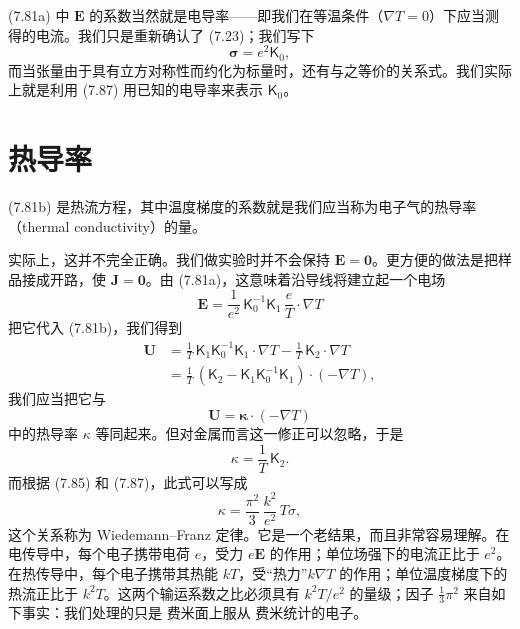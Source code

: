 (7.81a) 中 $\mathbf{E}$ 的系数当然就是电导率——即我们在等温条件（$\nabla T=0$）下应当测得的电流。我们只是重新确认了 (7.23)；我们写下
\begin{equation*}
\boldsymbol{\sigma}=e^{2}\mathsf{K}_{0},\tag{7.87}
\end{equation*}
而当张量由于具有立方对称性而约化为标量时，还有与之等价的关系式。我们实际上就是利用 (7.87) 用已知的电导率来表示 $\mathsf{K}_{0}$。

\section{热导率}

(7.81b) 是热流方程，其中温度梯度的系数就是我们应当称为电子气的热导率（thermal conductivity）的量。

实际上，这并不完全正确。我们做实验时并不会保持 $\mathbf{E}=\mathbf{0}$。更方便的做法是把样品接成开路，使 $\mathbf{J}=\mathbf{0}$。由 (7.81a)，这意味着沿导线将建立起一个电场
\begin{equation*}
\mathbf{E}=\frac{1}{e^{2}}\,\mathsf{K}_{0}^{-1}\mathsf{K}_{1}\,\frac{e}{T}\cdot\nabla T\tag{7.88}
\end{equation*}
把它代入 (7.81b)，我们得到
\begin{align*}
\mathbf{U}&=\frac{1}{T}\,\mathsf{K}_{1}\mathsf{K}_{0}^{-1}\mathsf{K}_{1}\cdot\nabla T-\frac{1}{T}\,\mathsf{K}_{2}\cdot\nabla T\\
&=\frac{1}{T}\,(\mathsf{K}_{2}-\mathsf{K}_{1}\mathsf{K}_{0}^{-1}\mathsf{K}_{1})\cdot(-\nabla T),\tag{7.89}
\end{align*}
我们应当把它与
\begin{equation*}
\mathbf{U}=\boldsymbol{\kappa}\cdot(-\nabla T)\tag{7.90}
\end{equation*}
中的热导率 $\kappa$ 等同起来。但对金属而言这一修正可以忽略，于是
\begin{equation*}
\kappa=\frac{1}{T}\,\mathsf{K}_{2}.\tag{7.91}
\end{equation*}
而根据 (7.85) 和 (7.87)，此式可以写成
\begin{equation*}
\kappa=\frac{\pi^{2}}{3}\,\frac{k^{2}}{e^{2}}\,T\sigma,\tag{7.92}
\end{equation*}
这个关系称为 Wiedemann--Franz 定律。它是一个老结果，而且非常容易理解。在电传导中，每个电子携带电荷 $e$，受力 $e\mathbf{E}$ 的作用；单位场强下的电流正比于 $e^{2}$。在热传导中，每个电子携带其热能 $kT$，受“热力”$k\nabla T$ 的作用；单位温度梯度下的热流正比于 $k^{2}T$。这两个输运系数之比必须具有 $k^{2}T/e^{2}$ 的量级；因子 $\frac{1}{3}\pi^{2}$ 来自如下事实：我们处理的只是 费米面上服从 费米统计的电子。

